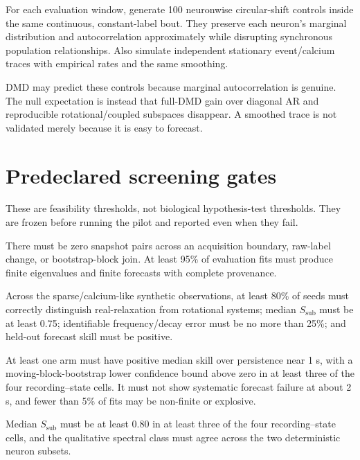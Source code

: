 \documentclass[11pt,a4paper]{article}
\begin{document}
For each evaluation window, generate 100 neuronwise circular-shift controls
inside the same continuous, constant-label bout. They preserve each neuron's
marginal distribution and autocorrelation approximately while disrupting
synchronous population relationships. Also simulate independent stationary
event/calcium traces with empirical rates and the same smoothing.

DMD may predict these controls because marginal autocorrelation is genuine. The
null expectation is instead that full-DMD gain over diagonal AR and reproducible
rotational/coupled subspaces disappear. A smoothed trace is not validated merely
because it is easy to forecast.

\section{Predeclared screening gates}

These are feasibility thresholds, not biological hypothesis-test thresholds.
They are frozen before running the pilot and reported even when they fail.

\begin{gatebox}
There must be zero snapshot pairs across an acquisition boundary, raw-label
change, or bootstrap-block join. At least 95\% of evaluation fits must produce
finite eigenvalues and finite forecasts with complete provenance.
\end{gatebox}

\begin{gatebox}
Across the sparse/calcium-like synthetic observations, at least 80\% of seeds
must correctly distinguish real-relaxation from rotational systems; median
$S_{\mathrm{sub}}$ must be at least 0.75; identifiable frequency/decay error must
be no more than 25\%; and held-out forecast skill must be positive.
\end{gatebox}

\begin{gatebox}
At least one arm must have positive median skill over persistence near 1 s, with
a moving-block-bootstrap lower confidence bound above zero in at least three of
the four recording--state cells. It must not show systematic forecast failure at
about 2 s, and fewer than 5\% of fits may be non-finite or explosive.
\end{gatebox}

\begin{gatebox}
Median $S_{\mathrm{sub}}$ must be at least 0.80 in at least three of the four
recording--state cells, and the qualitative spectral class must agree across the
two deterministic neuron subsets.
\end{gatebox}
\end{document}
